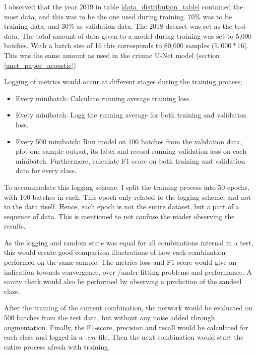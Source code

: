         I observed that the year 2019 in table \ref{data_distribution_table} contained the most data, and this was to be the one used during training. 70\% was to be training data, and 30\% as validation data. The 2018 dataset was set as the test data. The total amount of data given to a model during training was set to 5,000 batches. With a batch size of 16 this corresponds to 80,000 samples ($5,000 * 16$). This was the same amount as used in the \gls{crimac} U-Net model (section \ref{unet_paper_acoustic})
        
        Logging of metrics would occur at different stages during the training process;
            \begin{itemize}
                \item Every minibatch: Calculate running average training loss.
                \item Every minibatch: Logg the running average for both training and validation loss.
                \item Every 500 minibatch: Run model on 100 batches from the validation data, plot one sample output, its label and record running validation loss on each minibatch. Furthermore, calculate F1-score on both training and validation data for every class.
            \end{itemize}
        To accommodate this logging scheme, I split the training process into 50 epochs, with 100 batches in each. This epoch only related to the logging scheme, and not to the data itself. Hence, each epoch is not the entire dataset, but a part of a sequence of data. This is mentioned to not confuse the reader observing the results.
    
        As the logging and random state was equal for all combinations internal in a test, this would create good comparison illustrations of how each combination performed on the same sample. The metrics loss and F1-score would give an indication towards convergence, over-/under-fitting problems and performance. A sanity check would also be performed by observing a prediction of the sandeel class.
        
        After the training of the current combination, the network would be evaluated on 500 batches from the test data, but without any noise added through augmentation. Finally, the F1-score, precision and recall would be calculated for each class and logged in a \textit{.csv} file. Then the next combination would start the entire process afresh with training.
        
